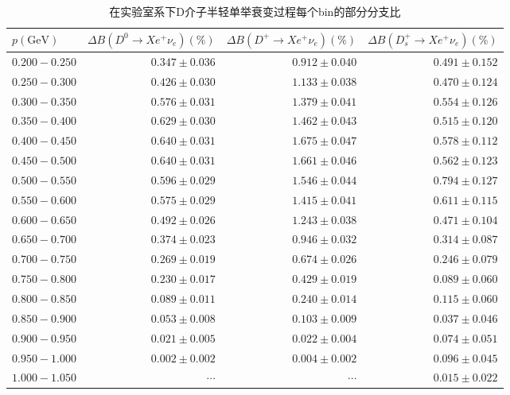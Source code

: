 \begin{table}[h!]
    \centering
    \scriptsize  %
    \begin{tabular}{lrrr}
        \hline \hline
        $p(\mathrm{GeV})$ & $\Delta B\left(D^0 \rightarrow X e^{+} \nu_e\right)(\%)$ & $\Delta B\left(D^{+} \rightarrow X e^{+} \nu_e\right)(\%)$ & $\Delta B\left(D_s^{+} \rightarrow X e^{+} \nu_e\right)(\%)$ \\
        \hline 
        $0.200-0.250$ & $0.347 \pm 0.036$ & $0.912 \pm 0.040$ & $0.491 \pm 0.152$ \\
        $0.250-0.300$ & $0.426 \pm 0.030$ & $1.133 \pm 0.038$ & $0.470 \pm 0.124$ \\
        $0.300-0.350$ & $0.576 \pm 0.031$ & $1.379 \pm 0.041$ & $0.554 \pm 0.126$ \\
        $0.350-0.400$ & $0.629 \pm 0.030$ & $1.462 \pm 0.043$ & $0.515 \pm 0.120$ \\
        $0.400-0.450$ & $0.640 \pm 0.031$ & $1.675 \pm 0.047$ & $0.578 \pm 0.112$ \\
        $0.450-0.500$ & $0.640 \pm 0.031$ & $1.661 \pm 0.046$ & $0.562 \pm 0.123$ \\
        $0.500-0.550$ & $0.596 \pm 0.029$ & $1.546 \pm 0.044$ & $0.794 \pm 0.127$ \\
        $0.550-0.600$ & $0.575 \pm 0.029$ & $1.415 \pm 0.041$ & $0.611 \pm 0.115$ \\
        $0.600-0.650$ & $0.492 \pm 0.026$ & $1.243 \pm 0.038$ & $0.471 \pm 0.104$ \\
        $0.650-0.700$ & $0.374 \pm 0.023$ & $0.946 \pm 0.032$ & $0.314 \pm 0.087$ \\
        $0.700-0.750$ & $0.269 \pm 0.019$ & $0.674 \pm 0.026$ & $0.246 \pm 0.079$ \\
        $0.750-0.800$ & $0.230 \pm 0.017$ & $0.429 \pm 0.019$ & $0.089 \pm 0.060$ \\
        $0.800-0.850$ & $0.089 \pm 0.011$ & $0.240 \pm 0.014$ & $0.115 \pm 0.060$ \\
        $0.850-0.900$ & $0.053 \pm 0.008$ & $0.103 \pm 0.009$ & $0.037 \pm 0.046$ \\
        $0.900-0.950$ & $0.021 \pm 0.005$ & $0.022 \pm 0.004$ & $0.074 \pm 0.051$ \\
        $0.950-1.000$ & $0.002 \pm 0.002$ & $0.004 \pm 0.002$ & $0.096 \pm 0.045$ \\
        $1.000-1.050$ & $\cdots$ & $\cdots$ & $0.015 \pm 0.022$ \\
        \hline \hline
    \end{tabular}
    \caption{在实验室系下D介子半轻单举衰变过程每个bin的部分分支比}
    \label{tab:cleo_electron_sp}
\end{table}

